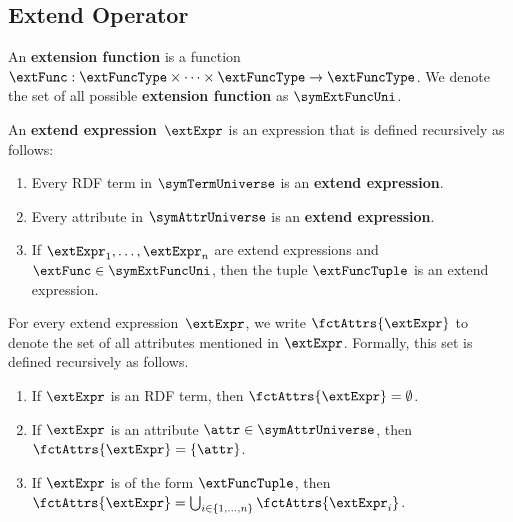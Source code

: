 \subsection{Extend Operator}%
\label{sub:extend_operator}

\begin{definition}
	\label{def:ExtensionFunction}
	An \textbf{extension function} is a function $\extFunc: \extFuncType \times \dots \times \extFuncType \rightarrow \extFuncType$.
	We denote the set of all possible \textbf{extension function} as $\symExtFuncUni$.
\end{definition}

\begin{definition}
	An \textbf{extend expression}~$\extExpr$ is an expression that is defined recursively as
	follows:
	\begin{enumerate}
		\item
		    Every RDF term in $\symTermUniverse$ is an \textbf{extend expression}.
		\item
            Every attribute in $\symAttrUniverse$ is an \textbf{extend expression}.
		\item
		      If $\extExpr_1,\dots,\extExpr_n$ are extend expressions and
		      $\extFunc \in \symExtFuncUni$, then the tuple $\extFuncTuple$ is an
		      extend expression.
	\end{enumerate}
\end{definition}

For every extend expression~$\extExpr$, we write $\fctAttrs{\extExpr}$ to denote the set of all attributes mentioned in $\extExpr$. Formally, this set is defined recursively as follows.
\begin{enumerate}
	\item If $\extExpr$ is an RDF term, then $\fctAttrs{\extExpr} = \emptyset$.
	\item If $\extExpr$ is an attribute $\attr \in \symAttrUniverse$, then $\fctAttrs{\extExpr} = \{\attr\}$.
	\item If $\extExpr$ is of the form $\extFuncTuple$, then $\fctAttrs{\extExpr} = \bigcup_{i \in \{1,\ldots,n\}} \fctAttrs{\extExpr_i}$.
\end{enumerate}



